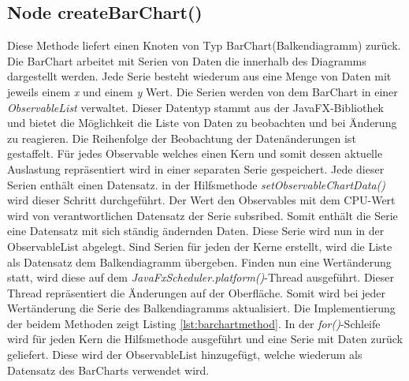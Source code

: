 \subsection{Node createBarChart()}
 
Diese Methode liefert einen Knoten von Typ BarChart(Balkendiagramm) zurück. Die BarChart arbeitet mit Serien von Daten die innerhalb des Diagramms dargestellt werden. Jede Serie besteht wiederum aus eine Menge von Daten mit jeweils einem \textit{x} und einem \textit{y} Wert. Die Serien werden von dem BarChart in einer \textit{ObservableList} verwaltet. Dieser Datentyp stammt aus der JavaFX-Bibliothek und bietet die Möglichkeit die Liste von Daten zu beobachten und bei Änderung zu reagieren. Die Reihenfolge der Beobachtung der Datenänderungen ist gestaffelt. Für jedes Observable welches einen Kern und somit dessen aktuelle Auslastung repräsentiert wird in einer separaten Serie gespeichert. Jede dieser Serien enthält einen Datensatz. in der Hilfsmethode \textit{setObservableChartData()} wird dieser Schritt durchgeführt. Der Wert den Observables mit dem CPU-Wert wird von verantwortlichen Datensatz der Serie subsribed. Somit enthält die Serie eine Datensatz mit sich ständig ändernden Daten. Diese Serie wird nun in der ObservableList abgelegt. Sind Serien für jeden der Kerne erstellt, wird die Liste als Datensatz dem Balkendiagramm übergeben. Finden nun eine Wertänderung statt, wird diese auf dem \textit{JavaFxScheduler.platform()}-Thread ausgeführt. Dieser Thread repräsentiert die Änderungen auf der Oberfläche. Somit wird bei jeder Wertänderung die Serie des Balkendiagramms aktualisiert. Die Implementierung der beidem Methoden zeigt Listing \ref{lst:barchartmethod}. In der \textit{for()}-Schleife wird für jeden Kern die Hilfsmethode ausgeführt und eine Serie mit Daten zurück geliefert. Diese wird der ObservableList hinzugefügt, welche wiederum als Datensatz des BarCharts verwendet wird.
